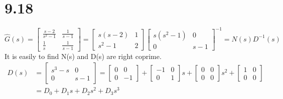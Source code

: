 \documentclass{article}
\begin{document}
\section*{9.18}
\[\hat{G}(s)=
\left[
\begin{array}{cc}
    \frac{s-2}{s^2-1} & \frac{1}{s-1}\\
    \frac{1}{s} & \frac{1}{s-1}
\end{array}
\right]=
\left[
    \begin{array}{cc}
        s(s-2) & 1\\
        s^2-1 & 2
    \end{array}
\right]\left[
    \begin{array}{cc}
        s(s^2-1) & 0\\
        0 & s-1
    \end{array}
\right]^{-1}
=N(s)D^{-1}(s)
\]
It is easily to find N(s) and D(s) are right coprime.
\[
\begin{split}
D(s)& =\left[
    \begin{array}{cc}
        s^3-s & 0\\
        0 & s-1
    \end{array}
\right]=
\left[
    \begin{array}{cc}
        0 & 0\\
        0 & -1
    \end{array}
\right]+
\left[
    \begin{array}{cc}
        -1 & 0\\
        0 & 1
    \end{array}
\right]s+
\left[
    \begin{array}{cc}
        0 & 0\\
        0 & 0
    \end{array}
\right]s^2+
\left[
    \begin{array}{cc}
        1 & 0\\
        0 & 0
    \end{array}
\right]
\\
& =D_0+D_1s+D_2s^2+D_3s^3
\end{split}
\]
\end{document}
